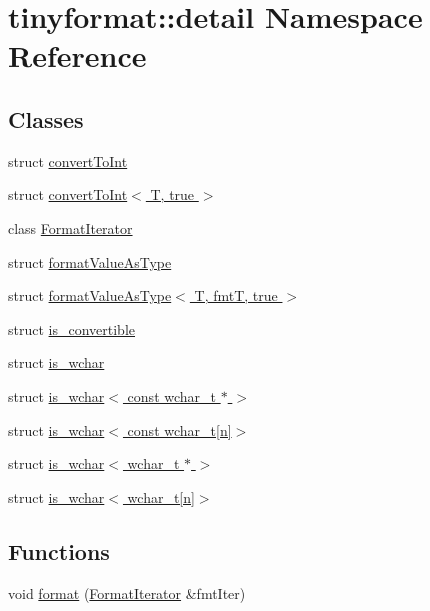 \hypertarget{namespacetinyformat_1_1detail}{}\section{tinyformat\+:\+:detail Namespace Reference}
\label{namespacetinyformat_1_1detail}
\subsection*{Classes}
\begin{DoxyCompactItemize}
\item 
struct \hyperlink{structtinyformat_1_1detail_1_1convert_to_int}{convert\+To\+Int}
\item 
struct \hyperlink{structtinyformat_1_1detail_1_1convert_to_int_3_01_t_00_01true_01_4}{convert\+To\+Int$<$ T, true $>$}
\item 
class \hyperlink{classtinyformat_1_1detail_1_1_format_iterator}{Format\+Iterator}
\item 
struct \hyperlink{structtinyformat_1_1detail_1_1format_value_as_type}{format\+Value\+As\+Type}
\item 
struct \hyperlink{structtinyformat_1_1detail_1_1format_value_as_type_3_01_t_00_01fmt_t_00_01true_01_4}{format\+Value\+As\+Type$<$ T, fmt\+T, true $>$}
\item 
struct \hyperlink{structtinyformat_1_1detail_1_1is__convertible}{is\+\_\+convertible}
\item 
struct \hyperlink{structtinyformat_1_1detail_1_1is__wchar}{is\+\_\+wchar}
\item 
struct \hyperlink{structtinyformat_1_1detail_1_1is__wchar_3_01const_01wchar__t_01_5_01_4}{is\+\_\+wchar$<$ const wchar\+\_\+t $\ast$ $>$}
\item 
struct \hyperlink{structtinyformat_1_1detail_1_1is__wchar_3_01const_01wchar__t[n]_4}{is\+\_\+wchar$<$ const wchar\+\_\+t\mbox{[}n\mbox{]}$>$}
\item 
struct \hyperlink{structtinyformat_1_1detail_1_1is__wchar_3_01wchar__t_01_5_01_4}{is\+\_\+wchar$<$ wchar\+\_\+t $\ast$ $>$}
\item 
struct \hyperlink{structtinyformat_1_1detail_1_1is__wchar_3_01wchar__t[n]_4}{is\+\_\+wchar$<$ wchar\+\_\+t\mbox{[}n\mbox{]}$>$}
\end{DoxyCompactItemize}
\subsection*{Functions}
\begin{DoxyCompactItemize}
\item 
void \hyperlink{namespacetinyformat_1_1detail_aa4b0590b3e34562c2d252a2086cec7ba}{format} (\hyperlink{classtinyformat_1_1detail_1_1_format_iterator}{Format\+Iterator} \&fmt\+Iter)
\end{DoxyCompactItemize}


